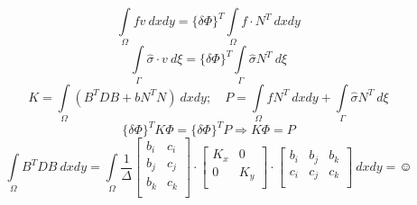 	\[
	\int\limits_{\Omega}fv\ dxdy = \{\delta\Phi\}^T \int\limits_{\Omega}f \cdot N^T \ dx dy
	\]
	\[
	\int\limits_{\Gamma} \hat \sigma \cdot v\ d\xi = \{\delta \Phi\}^T \int\limits_{\Gamma} \hat \sigma N^T\ d\xi
	\]
	\[
	K = \int\limits_{\Omega}(B^T D B + b N^T N)\ dx dy;\quad P = \int\limits_{\Omega}fN^T\ dx dy + \int\limits_{\Gamma} \hat \sigma N^T\ d\xi
	\]
	\[
	\{\delta\Phi\}^T K \Phi = \{\delta\Phi\}^T P \Rightarrow K \Phi = P
	\]
	\[
		\int\limits_{\Omega} B^T D B \ dx dy = \int\limits_{\Omega} \frac{1}{\Delta} 
		\begin{bmatrix}
		b_i & c_i\\
		b_j & c_j\\
		b_k & c_k\\
		\end{bmatrix}
		\cdot
		\begin{bmatrix}
		K_x & 0\\
		0 & K_y\\
		\end{bmatrix}
		\cdot
		\begin{bmatrix}
		b_i & b_j & b_k\\
		c_i & c_j & c_k\\
		\end{bmatrix}
		\ dx dy = \smiley
	\]
	
